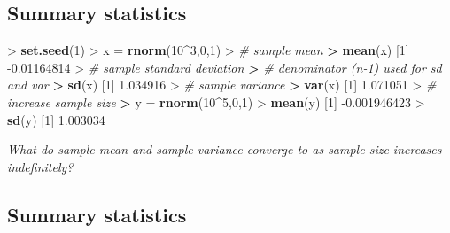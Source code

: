 \documentclass[]{article}
\newenvironment{Shaded}{\begin{snugshade}}{\end{snugshade}}
\newcommand{\KeywordTok}[1]{\textcolor[rgb]{0.13,0.29,0.53}{\textbf{{#1}}}}
\newcommand{\DecValTok}[1]{\textcolor[rgb]{0.00,0.00,0.81}{{#1}}}
\newcommand{\FloatTok}[1]{\textcolor[rgb]{0.00,0.00,0.81}{{#1}}}
\newcommand{\StringTok}[1]{\textcolor[rgb]{0.31,0.60,0.02}{{#1}}}
\newcommand{\CommentTok}[1]{\textcolor[rgb]{0.56,0.35,0.01}{\textit{{#1}}}}
\newcommand{\ErrorTok}[1]{\textcolor[rgb]{0.64,0.00,0.00}{\textbf{{#1}}}}
\newcommand{\NormalTok}[1]{{#1}}
\begin{document}
\subsection{Summary statistics}\label{summary-statistics}

\begin{Shaded}
\begin{Highlighting}[]
\NormalTok{>}\StringTok{ }\KeywordTok{set.seed}\NormalTok{(}\DecValTok{1}\NormalTok{)}
\NormalTok{>}\StringTok{ }\NormalTok{x =}\StringTok{ }\KeywordTok{rnorm}\NormalTok{(}\DecValTok{10}\NormalTok{^}\DecValTok{3}\NormalTok{,}\DecValTok{0}\NormalTok{,}\DecValTok{1}\NormalTok{)}
\NormalTok{>}\StringTok{ }\CommentTok{# sample mean}
\ErrorTok{>}\StringTok{ }\KeywordTok{mean}\NormalTok{(x)}
\NormalTok{[}\DecValTok{1}\NormalTok{] -}\FloatTok{0.01164814}
\NormalTok{>}\StringTok{ }\CommentTok{# sample standard deviation}
\ErrorTok{>}\StringTok{ }\CommentTok{# denominator (n-1) used for sd and var}
\ErrorTok{>}\StringTok{ }\KeywordTok{sd}\NormalTok{(x)}
\NormalTok{[}\DecValTok{1}\NormalTok{] }\FloatTok{1.034916}
\NormalTok{>}\StringTok{ }\CommentTok{# sample variance}
\ErrorTok{>}\StringTok{ }\KeywordTok{var}\NormalTok{(x)}
\NormalTok{[}\DecValTok{1}\NormalTok{] }\FloatTok{1.071051}
\NormalTok{>}\StringTok{ }\CommentTok{# increase sample size}
\ErrorTok{>}\StringTok{ }\NormalTok{y =}\StringTok{ }\KeywordTok{rnorm}\NormalTok{(}\DecValTok{10}\NormalTok{^}\DecValTok{5}\NormalTok{,}\DecValTok{0}\NormalTok{,}\DecValTok{1}\NormalTok{)}
\NormalTok{>}\StringTok{ }\KeywordTok{mean}\NormalTok{(y)}
\NormalTok{[}\DecValTok{1}\NormalTok{] -}\FloatTok{0.001946423}
\NormalTok{>}\StringTok{ }\KeywordTok{sd}\NormalTok{(y)}
\NormalTok{[}\DecValTok{1}\NormalTok{] }\FloatTok{1.003034}
\end{Highlighting}
\end{Shaded}

\emph{What do sample mean and sample variance converge to as sample size
increases indefinitely?}

\subsection{Summary statistics}\label{summary-statistics-1}
\end{document}
